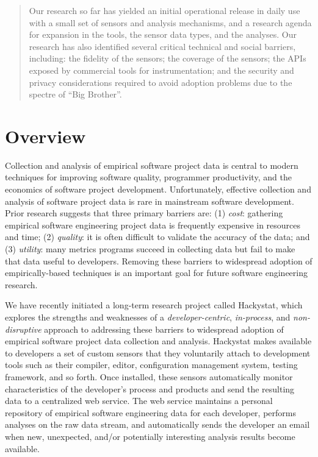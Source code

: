 \begin{titlepage}
\begin{center}
\begin{abstract}
Our research so far has yielded an initial operational release in daily use
with a small set of sensors and analysis mechanisms, and a research agenda
for expansion in the tools, the sensor data types, and the analyses. Our
research has also identified several critical technical and social
barriers, including: the fidelity of the sensors; the coverage of the
sensors; the APIs exposed by commercial tools for instrumentation; and the
security and privacy considerations required to avoid adoption problems due
to the spectre of ``Big Brother''.


\end{abstract}

\end{center}
\end{titlepage}

\section*{Overview}

Collection and analysis of empirical software project data is central to
modern techniques for improving software quality, programmer productivity,
and the economics of software project development.  Unfortunately,
effective collection and analysis of software project data is rare in
mainstream software development. Prior research suggests that three primary
barriers are: (1) {\em cost}: gathering empirical software engineering
project data is frequently expensive in resources and time; (2) {\em
  quality}: it is often difficult to validate the accuracy of the data; and
(3) {\em utility}: many metrics programs succeed in collecting data but
fail to make that data useful to developers.   Removing these barriers
to widespread adoption of empirically-based techniques is an important goal 
for future software engineering research.

We have recently initiated a long-term research project called Hackystat,
which explores the strengths and weaknesses of a {\em developer-centric},
{\em in-process}, and {\em non-disruptive} approach to addressing these
barriers to widespread adoption of empirical software project data
collection and analysis.  Hackystat makes available to developers a set of
custom sensors that they voluntarily attach to development
tools such as their compiler, editor, configuration management system,
testing framework, and so forth.  Once installed, these sensors
automatically monitor characteristics of the developer's process and
products and send the resulting data to a centralized web service.  The web
service maintains a personal repository of empirical software engineering data for
each developer, performs analyses on the raw data stream, and automatically
sends the developer an email when new, unexpected, and/or potentially
interesting analysis results become available.

